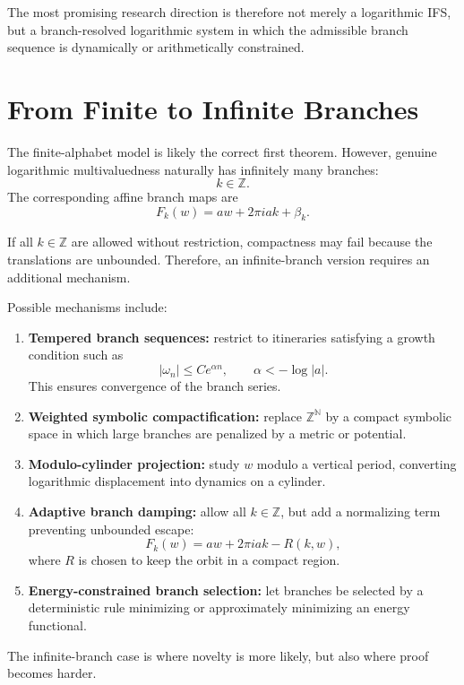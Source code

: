 \documentclass[12pt]{article}
\newcommand{\Z}{\mathbb{Z}}
\newcommand{\N}{\mathbb{N}}
\begin{document}
	The most promising research direction is therefore not merely a logarithmic IFS, but a branch-resolved logarithmic system in which the admissible branch sequence is dynamically or arithmetically constrained.
	
	\section{From Finite to Infinite Branches}
	
	The finite-alphabet model is likely the correct first theorem. However, genuine logarithmic multivaluedness naturally has infinitely many branches:
	\[
	k\in\Z.
	\]
	The corresponding affine branch maps are
	\[
	F_k(w)=a w + 2\pi i a k + \beta_k.
	\]
	
	If all \(k\in\Z\) are allowed without restriction, compactness may fail because the translations are unbounded. Therefore, an infinite-branch version requires an additional mechanism.
	
	Possible mechanisms include:
	
	\begin{enumerate}
		\item \textbf{Tempered branch sequences:}
		restrict to itineraries satisfying a growth condition such as
		\[
		|\omega_n|\leq C e^{\alpha n},
		\qquad
		\alpha < -\log |a|.
		\]
		This ensures convergence of the branch series.
		
		\item \textbf{Weighted symbolic compactification:}
		replace \(\Z^{\N}\) by a compact symbolic space in which large branches are penalized by a metric or potential.
		
		\item \textbf{Modulo-cylinder projection:}
		study \(w\) modulo a vertical period, converting logarithmic displacement into dynamics on a cylinder.
		
		\item \textbf{Adaptive branch damping:}
		allow all \(k\in\Z\), but add a normalizing term preventing unbounded escape:
		\[
		F_k(w)=a w + 2\pi i a k - R(k,w),
		\]
		where \(R\) is chosen to keep the orbit in a compact region.
		
		\item \textbf{Energy-constrained branch selection:}
		let branches be selected by a deterministic rule minimizing or approximately minimizing an energy functional.
	\end{enumerate}
	
	The infinite-branch case is where novelty is more likely, but also where proof becomes harder.
	
\end{document}

